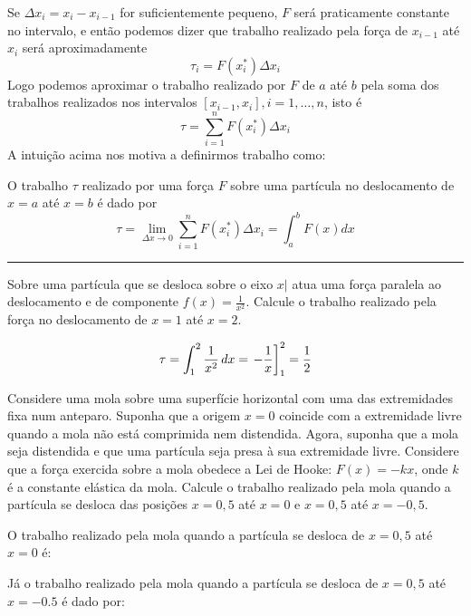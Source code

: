 \cleardoublepage\documentclass[../main.tex]{subfiles}
\begin{document}
Se \(\Delta x_i = x_i -x_{i-1}\) for suficientemente pequeno, $F$ será praticamente constante no intervalo, e então podemos dizer que trabalho realizado pela força de \(x_{i-1}\) até \(x_i \) será
aproximadamente
$$\tau_i=F(x_i^*)\Delta x_i$$
Logo podemos aproximar o trabalho realizado por \(F\) de \(a\) até \( b\) pela soma dos trabalhos realizados nos intervalos $[x_{i-1}, x_i],  i = 1, \ldots ,n$, isto é
\[\tau=\sum_{i=1}^n  F(x_i^*)\Delta x_i\]
A intuição acima nos motiva a definirmos trabalho como:
\begin{framed}
\begin{definition}
    O trabalho $\tau$ realizado por uma força $F$ sobre uma partícula
no deslocamento de $x = a$ até $x = b$ é dado por
\[\tau=\lim_{\Delta x\to 0} \sum_{i=1}^n  F(x_i^*)\Delta x_i=\int_a^b F(x) dx\]
\end{definition}
\end{framed}
\hrule
\begin{ex}
Sobre uma partícula que se desloca sobre o eixo $x|$ atua uma força paralela ao deslocamento e de componente $f(x)=\frac{1}{x^2}$. Calcule o trabalho realizado pela força no deslocamento de $x = 1$ até $x = 2$.\\
\begin{solut}
$$\tau=\int_{1}^{2} \frac{1}{x^2} \, dx=\left.-\frac{1}{x}\right]_1^2=\frac{1}{2}$$
\end{solut}
\end{ex}
\begin{ex}
Considere uma mola sobre uma superfície horizontal com uma das extremidades fixa num anteparo. Suponha que a origem \(x = 0\) coincide com a extremidade livre quando a mola não está comprimida nem distendida. Agora, suponha que a mola seja distendida e que uma partícula seja presa à sua extremidade livre. Considere que a força exercida sobre a mola obedece a Lei de Hooke: \(F(x) = -kx\), onde \(k\) é a constante elástica da mola. Calcule o trabalho realizado pela mola quando a partícula se desloca das posições \(x = 0,5\) até
\(x = 0 \) e \(x = 0,5\) até \(x = -0,5\).\\
\begin{solut}
O trabalho realizado pela mola quando a partícula se desloca de  \(x = 0,5\) até
\(x = 0 \) é:

Já o trabalho realizado pela mola quando a partícula se desloca de  \(x = 0,5\) até
\(x = -0.5 \) é dado por:
\end{solut}
\end{ex}
\end{document}
